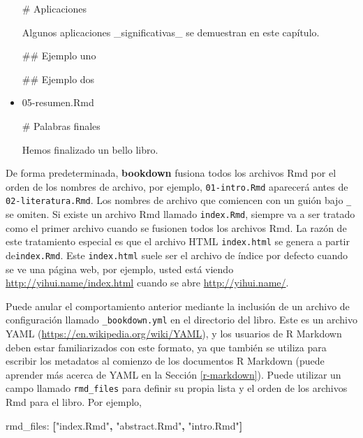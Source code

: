 \documentclass[12pt,]{krantz}
\makeatletter
\newenvironment{Shaded}{\begin{snugshade}}{\end{snugshade}}
\newcommand{\KeywordTok}[1]{\textcolor[rgb]{0.13,0.29,0.53}{\textbf{{#1}}}}
\newcommand{\StringTok}[1]{\textcolor[rgb]{0.31,0.60,0.02}{{#1}}}
\newcommand{\FunctionTok}[1]{\textcolor[rgb]{0.00,0.00,0.00}{{#1}}}
\newcommand{\NormalTok}[1]{{#1}}
\newenvironment{kframe}{%
\medskip{}
\setlength{\fboxsep}{.8em}
 \def\at@end@of@kframe{}%
 \ifinner\ifhmode%
  \def\at@end@of@kframe{\end{minipage}}%
  \begin{minipage}{\columnwidth}%
 \fi\fi%
 \def\FrameCommand##1{\hskip\@totalleftmargin \hskip-\fboxsep
 \colorbox{shadecolor}{##1}\hskip-\fboxsep
     \hskip-\linewidth \hskip-\@totalleftmargin \hskip\columnwidth}%
 \MakeFramed {\advance\hsize-\width
   \@totalleftmargin\z@ \linewidth\hsize
   \@setminipage}}%
 {\par\unskip\endMakeFramed%
 \at@end@of@kframe}
\renewenvironment{Shaded}{\begin{kframe}}{\end{kframe}}
\theoremstyle{definition}
\theoremstyle{definition}
\theoremstyle{remark}
\makeatother
\begin{document}
\begin{itemize}
\begin{Shaded}
\begin{Highlighting}[]
\FunctionTok{# Aplicaciones}

\NormalTok{Algunos aplicaciones _significativas_ se demuestran}
\NormalTok{en este capítulo.}

\FunctionTok{## Ejemplo uno}

\FunctionTok{## Ejemplo dos}
\end{Highlighting}
\end{Shaded}
\item
  05-resumen.Rmd

\begin{Shaded}
\begin{Highlighting}[]
\FunctionTok{# Palabras finales}

\NormalTok{Hemos finalizado un bello libro.}
\end{Highlighting}
\end{Shaded}
\end{itemize}

De forma predeterminada, \textbf{bookdown} fusiona todos los archivos
Rmd por el orden de los nombres de archivo, por ejemplo,
\texttt{01-intro.Rmd} aparecerá antes de \texttt{02-literatura.Rmd}. Los
nombres de archivo que comiencen con un guión bajo \texttt{\_} se
omiten. Si existe un archivo Rmd llamado \texttt{index.Rmd}, siempre va
a ser tratado como el primer archivo cuando se fusionen todos los
archivos Rmd. La razón de este tratamiento especial es que el archivo
HTML \texttt{index.html} se genera a partir de\texttt{index.Rmd}. Este
\texttt{index.html} suele ser el archivo de índice por defecto cuando se
ve una página web, por ejemplo, usted está viendo
\url{http://yihui.name/index.html} cuando se abre
\url{http://yihui.name/}.

Puede anular el comportamiento anterior mediante la inclusión de un
archivo de configuración llamado \texttt{\_bookdown.yml} en el
directorio del libro. Este es un archivo YAML
(\url{https://en.wikipedia.org/wiki/YAML}), y los usuarios de R Markdown
deben estar familiarizados con este formato, ya que también se utiliza
para escribir los metadatos al comienzo de los documentos R Markdown
(puede aprender más acerca de YAML en la Sección \ref{r-markdown}).
Puede utilizar un campo llamado \texttt{rmd\_files} para definir su
propia lista y el orden de los archivos Rmd para el libro. Por ejemplo,

\begin{Shaded}
\begin{Highlighting}[]
\FunctionTok{rmd_files:} \KeywordTok{[}\StringTok{"index.Rmd"}\KeywordTok{,} \StringTok{"abstract.Rmd"}\KeywordTok{,} \StringTok{"intro.Rmd"}\KeywordTok{]}
\end{Highlighting}
\end{Shaded}
\end{document}
